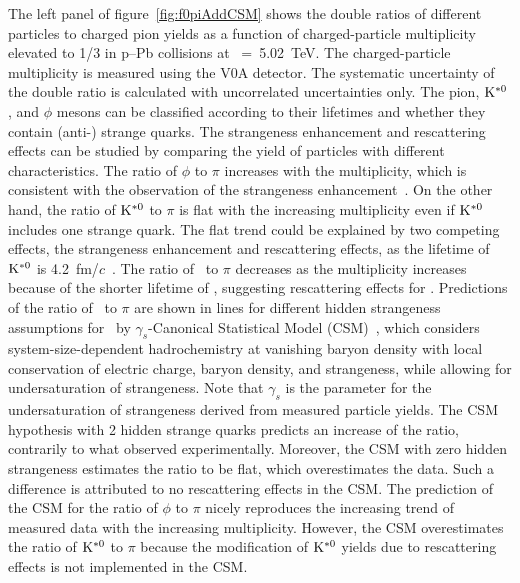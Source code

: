 The left panel of figure~\ref{fig:f0piAddCSM} shows the double ratios of different particles to charged pion yields as a function of charged-particle multiplicity elevated to 1/3 in p--Pb collisions at \snn~=~5.02~TeV. The charged-particle multiplicity is measured using the V0A detector. The systematic uncertainty of the double ratio is calculated with uncorrelated uncertainties only. The pion, $\rm{}K^{*0}$, and $\phi$ mesons can be classified according to their lifetimes and whether they contain (anti-) strange quarks. The strangeness enhancement and rescattering effects can be studied by comparing the yield of particles with different characteristics. The ratio of $\phi$ to $\pi$ increases with the multiplicity, which is consistent with the observation of the strangeness enhancement~\cite{ALICE:2016fzo}. On the other hand, the ratio of $\rm{}K^{*0}$ to $\pi$ is flat with the increasing multiplicity even if $\rm{}K^{*0}$ includes one strange quark. The flat trend could be explained by two competing effects, the strangeness enhancement and rescattering effects, as the lifetime of $\rm{}K^{*0}$ is 4.2~fm/$c$~\cite{ParticleDataGroup:2022pth}. The ratio of \fzero~to $\pi$ decreases as the multiplicity increases because of the shorter lifetime of \fzero, suggesting rescattering effects for \fzero. Predictions of the ratio of \fzero~to $\pi$ are shown in lines for different hidden strangeness assumptions for \fzero~by $\gamma_{s}$-Canonical Statistical Model (CSM)~\cite{Vovchenko:2019kes}, which considers system-size-dependent hadrochemistry at vanishing baryon density with local conservation of electric charge, baryon density, and strangeness, while allowing for undersaturation of strangeness. Note that $\gamma_{s}$ is the parameter for the undersaturation of strangeness derived from measured particle yields. The CSM hypothesis with 2 hidden strange quarks predicts an increase of the ratio, contrarily to what observed experimentally. Moreover, the CSM with zero hidden strangeness estimates the ratio to be flat, which overestimates the data. Such a difference is attributed to no rescattering effects in the CSM. The prediction of the CSM for the ratio of $\phi$ to $\pi$ nicely reproduces the increasing trend of measured data with the increasing multiplicity. However, the CSM overestimates the ratio of $\rm{}K^{*0}$ to $\pi$ because the modification of $\rm{}K^{*0}$ yields due to rescattering effects is not implemented in the CSM.

